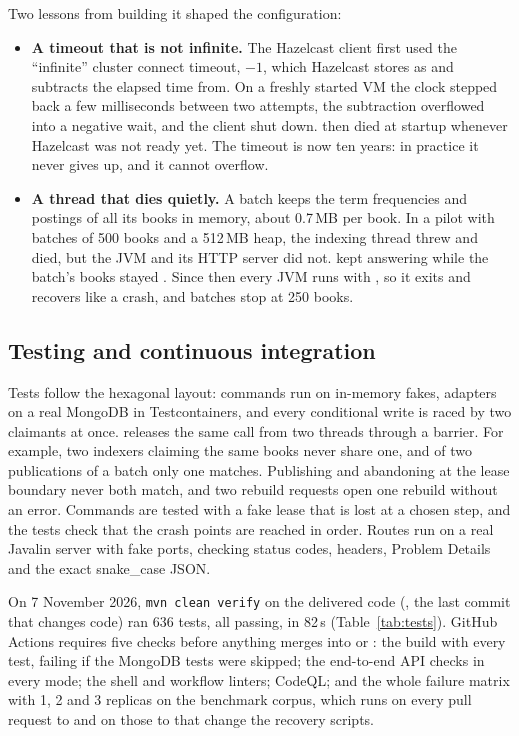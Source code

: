 Two lessons from building it shaped the configuration:
\begin{itemize}
\item \textbf{A timeout that is not infinite.} The Hazelcast client first used the ``infinite'' cluster connect
  timeout, $-1$, which Hazelcast stores as  and subtracts the elapsed time from. On a freshly
  started VM the clock stepped back a few milliseconds between two attempts, the subtraction overflowed into a negative
  wait, and the client shut down.  then died at startup whenever Hazelcast was not ready yet. The timeout
  is now ten years: in practice it never gives up, and it cannot overflow.
\item \textbf{A thread that dies quietly.} A batch keeps the term frequencies and postings of all its books in memory,
  about 0.7\,MB per book. In a pilot with batches of 500 books and a 512\,MB heap, the indexing thread threw
   and died, but the JVM and its HTTP server did not.  kept answering 
  while the batch's books stayed . Since then every JVM runs with , so
  it exits and recovers like a crash, and batches stop at 250 books.
\end{itemize}

\subsection{Testing and continuous integration}
\label{sec:testing}

Tests follow the hexagonal layout: commands run on in-memory fakes, adapters on a real MongoDB in Testcontainers, and
every conditional write is raced by two claimants at once.  releases the same call from two threads
through a barrier. For example, two indexers claiming the same books never share one, and of two publications of a
batch only one matches. Publishing and abandoning at the lease boundary never both match, and two rebuild requests open
one rebuild without an error. Commands are tested with a fake lease that is lost at a chosen step, and the tests check
that the crash points are reached in order. Routes run on a real Javalin server with fake ports, checking status
codes,  headers, Problem Details and the exact snake\_case JSON.

On 7 November 2026, \texttt{mvn clean verify} on the delivered code (, the last commit that changes code)
ran 636 tests, all passing, in 82\,s (Table~\ref{tab:tests}). GitHub Actions requires five checks before anything merges into  or :
the build with every test, failing if the MongoDB tests were skipped; the end-to-end API checks in every mode; the shell
and workflow linters; CodeQL; and the whole failure matrix with 1, 2 and 3 replicas on the benchmark corpus, which runs
on every pull request to  and on those to  that change the recovery scripts.


